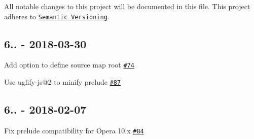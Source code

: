 All notable changes to this project will be documented in this file. This project adheres to \href{http://semver.org/}{\tt Semantic Versioning}.

\subsection*{6.. -\/ 2018-\/03-\/30}


\begin{DoxyItemize}
\item Add option to define source map root \href{https://github.com/browserify/browser-pack/pull/74}{\tt \#74}
\item Use uglify-\/js@2 to minify prelude \href{https://github.com/browserify/browser-pack/pull/87}{\tt \#87}
\end{DoxyItemize}

\subsection*{6.. -\/ 2018-\/02-\/07}


\begin{DoxyItemize}
\item Fix prelude compatibility for Opera 10.\+x \href{https://github.com/browserify/browser-pack/pull/84}{\tt \#84} 
\end{DoxyItemize}